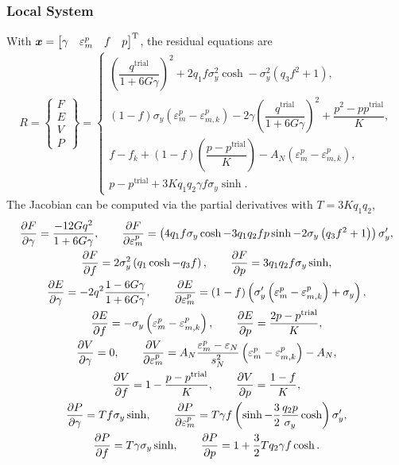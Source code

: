 \subsubsection{Local System}
With $\bm{x}=\begin{bmatrix}\gamma&\varepsilon^p_m&f&p\end{bmatrix}^{\mathrm{T}}$, the residual equations are
\begin{gather}
R=\begin{Bmatrix}
F\\E\\V\\P
\end{Bmatrix}=\left\{\begin{array}{l}
\left(\dfrac{q^\text{trial}}{1+6G\gamma}\right)^2+2q_1f\sigma_y^2\cosh-\sigma_y^2\left(q_3f^2+1\right),\\
\left(1-f\right)\sigma_y\left(\varepsilon^p_m-\varepsilon^p_{m,k}\right)-2\gamma\left(\dfrac{q^\text{trial}}{1+6G\gamma}\right)^2+\dfrac{p^2-pp^\text{trial}}{K},\\
f-f_k+\left(1-f\right)\left(\dfrac{p-p^\text{trial}}{K}\right)-A_N\left(\varepsilon^p_m-\varepsilon^p_{m,k}\right),\\[4mm]
p-p^\text{trial}+3Kq_1q_2\gamma{}f\sigma_y\sinh.
\end{array}\right.
\end{gather}
The Jacobian can be computed via the partial derivatives with $T=3Kq_1q_2$,
\begin{gather}
\dfrac{\partial{F}}{\partial{\gamma}}=\dfrac{-12Gq^2}{1+6G\gamma},\qquad
\dfrac{\partial{F}}{\partial{\varepsilon^p_m}}=\left(4q_1f\sigma_y\cosh-3q_1q_2fp\sinh-2\sigma_y\left(q_3f^2+1\right)\right)\sigma_y',\\
\dfrac{\partial{F}}{\partial{f}}=2\sigma_y^2\left(q_1\cosh-q_3f\right),\qquad
\dfrac{\partial{F}}{\partial{p}}=3q_1q_2f\sigma_y\sinh,\\
\dfrac{\partial{E}}{\partial{\gamma}}=-2q^2\dfrac{1-6G\gamma}{1+6G\gamma},\qquad
\dfrac{\partial{E}}{\partial{\varepsilon^p_m}}=\left(1-f\right)\left(\sigma_y'\left(\varepsilon^p_m-\varepsilon^p_{m,k}\right)+\sigma_y\right),\\
\dfrac{\partial{E}}{\partial{f}}=-\sigma_y\left(\varepsilon^p_m-\varepsilon^p_{m,k}\right),\qquad
\dfrac{\partial{E}}{\partial{p}}=\dfrac{2p-p^\text{trial}}{K},\\
\dfrac{\partial{V}}{\partial{\gamma}}=0,\qquad
\dfrac{\partial{V}}{\partial{\varepsilon^p_m}}=A_N\dfrac{\varepsilon^p_m-\varepsilon_N}{s_N^2}\left(\varepsilon^p_m-\varepsilon^p_{m,k}\right)-A_N,\\
\dfrac{\partial{V}}{\partial{f}}=1-\dfrac{p-p^\text{trial}}{K},\qquad
\dfrac{\partial{V}}{\partial{p}}=\dfrac{1-f}{K},\\
\dfrac{\partial{P}}{\partial{\gamma}}=Tf\sigma_y\sinh,\qquad
\dfrac{\partial{P}}{\partial{\varepsilon^p_m}}=T\gamma{}f\left(\sinh-\dfrac{3}{2}\dfrac{q_2p}{\sigma_y}\cosh\right)\sigma_y',\\
\dfrac{\partial{P}}{\partial{f}}=T\gamma{}\sigma_y\sinh,\qquad
\dfrac{\partial{P}}{\partial{p}}=1+\dfrac{3}{2}Tq_2\gamma{}f\cosh.
\end{gather}
